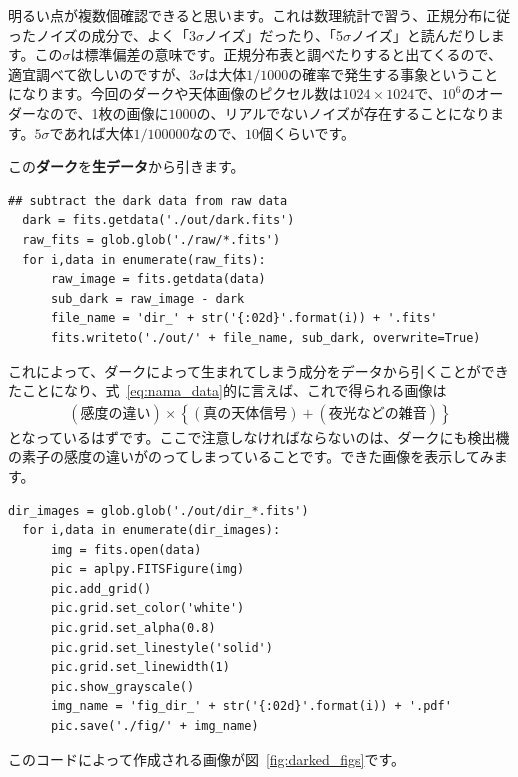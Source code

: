 明るい点が複数個確認できると思います。これは数理統計で習う、正規分布に従ったノイズの成分で、よく「3$\sigma$ノイズ」だったり、「5$\sigma$ノイズ」と読んだりします。この$\sigma$は標準偏差の意味です。正規分布表と調べたりすると出てくるので、適宜調べて欲しいのですが、3$\sigma$は大体$1/1000$の確率で発生する事象ということになります。今回のダークや天体画像のピクセル数は$1024\times1024$で、$10^{6}$のオーダーなので、1枚の画像に$1000$の、リアルでないノイズが存在することになります。$5\sigma$であれば大体$1/100000$なので、$10$個くらいです。\par
この\textbf{ダーク}を\textbf{生データ}から引きます。
\begin{lstlisting}[caption=生データからダークを引く, label=code:darkhiki]
  ## subtract the dark data from raw data
  dark = fits.getdata('./out/dark.fits')
  raw_fits = glob.glob('./raw/*.fits')
  for i,data in enumerate(raw_fits):
      raw_image = fits.getdata(data)
      sub_dark = raw_image - dark
      file_name = 'dir_' + str('{:02d}'.format(i)) + '.fits'
      fits.writeto('./out/' + file_name, sub_dark, overwrite=True)
\end{lstlisting}
これによって、ダークによって生まれてしまう成分をデータから引くことができたことになり、式~\eqref{eq:nama_data}的に言えば、これで得られる画像は
\begin{align}
  (\text{感度の違い}) \times \left\{  (\text{真の天体信号})+(夜光などの雑音) \right\}\label{eq:dir_data}
\end{align}
となっているはずです。ここで注意しなければならないのは、ダークにも検出機の素子の感度の違いがのってしまっていることです。できた画像を表示してみます。
\begin{lstlisting}[caption=ダーク引き済み画像の表示, label=code:darked_fig]
  dir_images = glob.glob('./out/dir_*.fits')
  for i,data in enumerate(dir_images):
      img = fits.open(data)
      pic = aplpy.FITSFigure(img)
      pic.add_grid()
      pic.grid.set_color('white')
      pic.grid.set_alpha(0.8)
      pic.grid.set_linestyle('solid')
      pic.grid.set_linewidth(1)
      pic.show_grayscale()
      img_name = 'fig_dir_' + str('{:02d}'.format(i)) + '.pdf'
      pic.save('./fig/' + img_name)
\end{lstlisting}
このコードによって作成される画像が図~\ref{fig:darked_figs}です。
